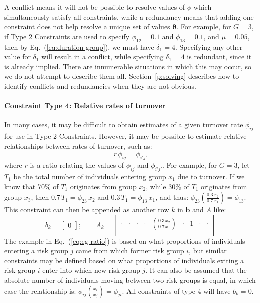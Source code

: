 A conflict means it will not be possible to resolve values of $\phi$
which simultaneously satisfy all constraints, while
a redundancy means that adding one constraint does not help resolve
a unique set of values $\bm{\theta}$.
For example, for $G = 3$,
if Type 2 Constraints are used to specify $\phi_{12} = 0.1$ and $\phi_{13} = 0.1$,
and $\mu = 0.05$, then by Eq.~(\ref{eq:duration-group}), we must have
$\delta_1 = 4$.
Specifying any other value for $\delta_1$ will result in a conflict,
while specifying $\delta_1 = 4$ is redundant,
since it is already implied.
There are innumerable situations in which this may occur,
so we do not attempt to describe them all.
Section~\ref{p:solving} describes how to identify
conflicts and redundancies when they are not obvious.
\paragraph{Constraint Type 4: Relative rates of turnover}
\label{con:rel-turnover}
In many cases, it may be difficult to
obtain estimates of a given turnover rate $\phi_{ij}$
for use in Type 2 Constraints.
However, it may be possible to estimate
relative relationships between rates of turnover,
such as:
\begin{equation}\label{eq:ratio}
r\,\phi_{ij} = \phi_{i'j'}
\end{equation}
where $r$ is a ratio relating the values of $\phi_{ij}$ and $\phi_{i'j'}$.
For example, for $G = 3$,
let $T_1$ be the total number of individuals entering group $x_1$ due to turnover.
If we know that
70\% of $T_1$ originates from group $x_2$, while
30\% of $T_1$ originates from group $x_3$,
then $0.7\,T_1 = \phi_{23} \, x_2$ and $0.3\,T_1 = \phi_{13} \, x_1$,
and thus: $\phi_{23} \left(\frac{0.3\,x_2}{0.7\,x_1}\right) = \phi_{13}$.
This constraint can then be appended as another row $k$ in $\bm{b}$ and $A$ like:
\begin{equation}\label{eq:eg-ratio}
b_k = \left[\begin{array}{c}
0
\end{array}\right];\qquad
A_k = \left[\begin{array}{ccccccccc}
\cdot & \cdot & \cdot & \cdot & \left(\frac{0.3\,x_2}{0.7\,x_1}\right) & \cdot & 1 & \cdot & \cdot \\
\end{array}\right] 
\end{equation}
The example in Eq.~(\ref{eq:eg-ratio}) is based on
what proportions of individuals entering a risk group $j$
came from which former risk group $i$,
but similar constraints may be defined based on
what proportions of individuals exiting a risk group $i$
enter into which new risk group $j$.
It can also be assumed that
the absolute number of individuals moving between two risk groups is equal,
in which case the relationship is:
$\phi_{ij} \left(\frac{x_i}{x_j}\right) = \phi_{ji}$.
All constraints of type 4 will have $b_k = 0$.
